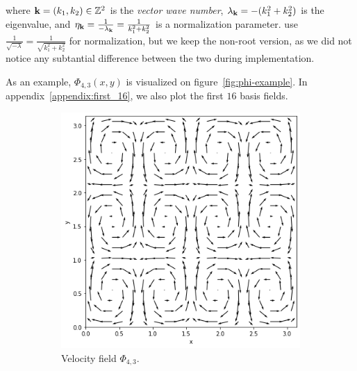 where $\vb{k} = (k_1, k_2) \in \mathbb{Z}^2$ is the \textit{vector wave number},
$\lambda_{\vb{k}} = -(k_1^2 + k_2^2)$ is the eigenvalue, and $\eta_{\vb{k}}
= \frac{1}{-\lambda_{\vb{k}}} = \frac{1}{k_1^2 + k_2^2}$ is a normalization
parameter.  \cite{scalable-eigenfluids} use $\frac{1}{\sqrt{-\lambda}}
= \frac{1}{\sqrt{k_1^2 + k_2^2}}$ for normalization, but we keep the non-root
version, as we did not notice any subtantial difference between the two during
implementation.

As an example, $\Phi_{4,3}(x,y)$ is visualized on figure~\ref{fig:phi-example}.
In appendix~\ref{appendix:first_16}, we also plot the first $16$ basis fields.

\begin{figure}
  \centering
  \begin{subfigure}[t]{0.48\textwidth}
    \centering
    \includegraphics[height=\textwidth]{figures/eigenfluids/k_4_3_vel.png}
    \caption{Velocity field $\Phi_{4,3}$.}
  \end{subfigure}
  \begin{subfigure}[t]{0.48\textwidth}
    \centering

\end{subfigure}
\end{figure}

